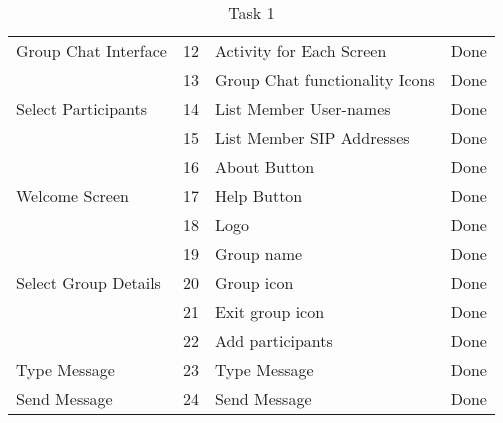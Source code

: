 \documentclass[a4paper]{article}
\begin{document}
\begin{table} [H]
\begin{tabular}{p{3cm} p{3cm} p{3.5cm} p{1cm}}
Group Chat Interface & 12 & Activity for Each Screen & Done\\ \cmidrule(l){2-4}

& 13 & Group Chat functionality Icons & Done\\ 
\midrule

Select Participants & 14 & List Member User-names & Done \\ \cmidrule(l){2-4}



 & 15 & List Member SIP Addresses & Done \\ 
\midrule

& 16 & About Button & Done \\ \cmidrule(l){2-4}

Welcome Screen & 17 & Help Button & Done\\ \cmidrule(l){2-4}

& 18 & Logo & Done\\ 
\midrule

 & 19 & Group name & Done\\\cmidrule(l){2-4}


Select Group Details &  20  & Group icon & Done\\\cmidrule(l){2-4}

 & 21 & Exit group icon & Done\\\cmidrule(l){2-4}

 & 22 & Add participants & Done\\ 
 \midrule

Type Message & 23 & Type Message & Done\\ 
 \midrule
 
 Send Message & 24 & Send Message & Done\\ 
\hline
\end{tabular}
\caption{Task 1} %
\label{tab:template} %
\end{table}

\pagebreak
 
\end{document}
